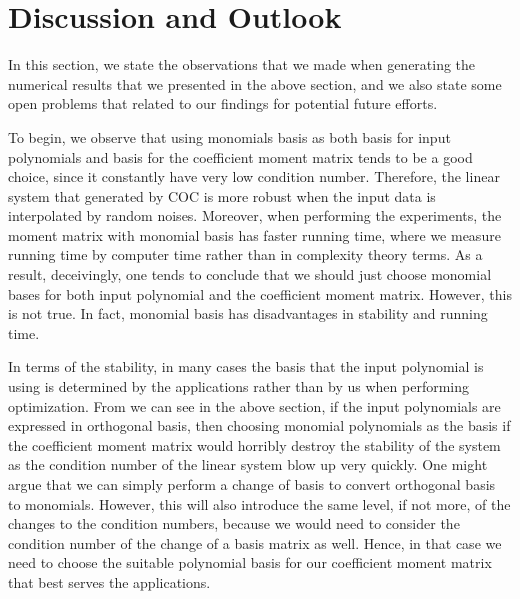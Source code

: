 \documentclass[12pt]{amsart}
\numberwithin{equation}{section}
\theoremstyle{definition}
\numberwithin{thm}{section}
\begin{document}

\newpage


\section{Discussion and Outlook}
\label{Sec:Dis and Outlook}

In this section, we state the observations that we made when generating the numerical results that we presented in the above section,
and we also state some open problems that related to our findings for potential future efforts. 

To begin, we observe that using monomials basis as both basis for input polynomials and basis for the coefficient moment matrix 
tends to be a good choice, since it constantly have very low condition number. 
Therefore, the linear system that generated by COC is more robust when the input data is interpolated by random noises. 
Moreover, when performing the experiments, the moment matrix with monomial basis has faster running time, 
where we measure running time by computer time rather than in complexity theory terms. 
As a result, deceivingly, one tends to conclude that we should just choose monomial bases for both input polynomial and the coefficient moment matrix.
However, this is not true. 
In fact, monomial basis has disadvantages in stability and running time. 

In terms of the stability, in many cases
the basis that the input polynomial is using is determined by the applications rather than by us when performing optimization.
From we can see in the above section, if the input polynomials are expressed in orthogonal basis, then choosing monomial 
polynomials as the basis if the coefficient moment matrix would horribly destroy the stability of the system as the condition number of the linear system blow up very quickly. 
One might argue that we can simply perform a change of basis to convert orthogonal basis to monomials. However,
this will also introduce the same level, if not more, of the changes to the condition numbers, because we would need to
consider the condition number of the change of a basis matrix as well. 
Hence, in that case we need to choose the suitable polynomial basis for our coefficient moment matrix that best serves the applications. 
\end{document}
